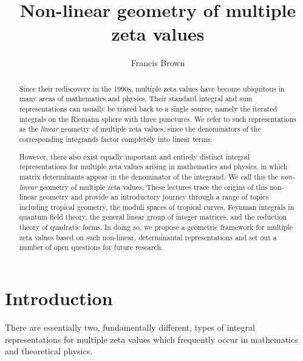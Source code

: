 \documentclass[12pt]{amsart}
\title{Non-linear geometry of multiple zeta values}
\author{Francis Brown}
\theoremstyle{plain}
\newcommand{\0}{\color{blue}{\mathsf{0}}}
\begin{document}
\begin{abstract}   Since their rediscovery in the 1990s, multiple zeta values have become ubiquitous in many areas  of mathematics and physics. 
Their standard integral and sum representations can usually be traced  back to a single source, namely the iterated integrals on the  Riemann sphere with three punctures.  We refer to such representations as the \emph{linear}  geometry of multiple zeta values, since the denominators of the corresponding  integrands  factor completely  into linear terms. 

 
However, there also exist equally important and entirely  distinct integral representations  for multiple zeta values  arising in  mathematics and physics,  in which  matrix determinants appear in the denominator of the integrand.  We call this the \emph{non-linear} geometry of multiple zeta values. 
These lectures trace the origins of this non-linear geometry and provide an introductory journey through a range of topics including tropical geometry, the moduli spaces of tropical curves, Feynman integrals  in quantum field theory, the general linear group of integer matrices,  and the reduction theory of quadratic forms. In doing so,
we  propose a  geometric framework for multiple zeta values based on such non-linear, determinantal representations  and set out a number of open questions for future research.


\end{abstract}

\maketitle

\section{Introduction}

There are essentially two, fundamentally different,  types of integral representations for multiple zeta values which frequently occur in mathematics and theoretical physics.   
\end{document}
